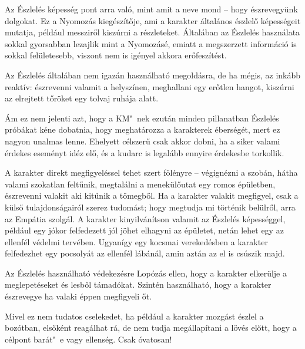 
Az Észlelés képesség pont arra való, mint amit a neve mond -- hogy észrevegyünk dolgokat. Ez a Nyomozás kiegészítője, ami a karakter általános észlelő képességeit mutatja, például messziről kiszúrni a részleteket. Általában az Észlelés használata sokkal gyorsabban lezajlik mint a Nyomozásé, emiatt a megszerzett információ is sokkal felületesebb, viszont nem is igényel akkora erőfeszítést.

\overcome Az Észlelés általában nem igazán használható megoldásra, de ha mégis, az inkább reaktív: észrevenni valamit a helyszínen, meghallani egy erőtlen hangot, kiszúrni az elrejtett tőröket egy tolvaj ruhája alatt.

Ám ez nem jelenti azt, hogy a KM"~nek ezután minden pillanatban Észlelés próbákat kéne dobatnia, hogy meghatározza a karakterek éberségét, mert ez nagyon unalmas lenne. Ehelyett célszerű csak akkor dobni, ha a siker valami érdekes eseményt idéz elő, és a kudarc is legalább ennyire érdekesbe torkollik.

\advantage A karakter direkt megfigyeléssel tehet szert fölényre -- végignézni a szobán, hátha valami szokatlan feltűnik, megtalálni a menekülőutat egy romos épületben, észrevenni valakit aki kitűnik a tömegből. Ha a karakter valakit megfigyel, csak a külső tulajdonságairól szerez tudomást; hogy megtudja mi történik belülről, arra az Empátia szolgál. A karakter kinyilvánítson valamit az Észlelés képességgel, például egy jókor felfedezett  jól jöhet elhagyni az épületet, netán lehet egy  az ellenfél védelmi tervében. Ugyanígy egy kocsmai verekedésben a karakter felfedezhet egy pocsolyát az ellenfél lábánál, amin aztán az el is csúszik majd.

\noattackatall

 Az Észlelés használható védekezésre Lopózás ellen, hogy a karakter elkerülje a meglepetéseket és lesből támadókat. Szintén használható, hogy a karakter észrevegye ha valaki éppen megfigyeli őt.




Mivel ez nem tudatos cselekedet, ha például a karakter mozgást észlel a bozótban, elsőként reagálhat rá, de nem tudja megállapítani a lövés előtt, hogy a célpont barát"~e vagy ellenség. Csak óvatosan!
